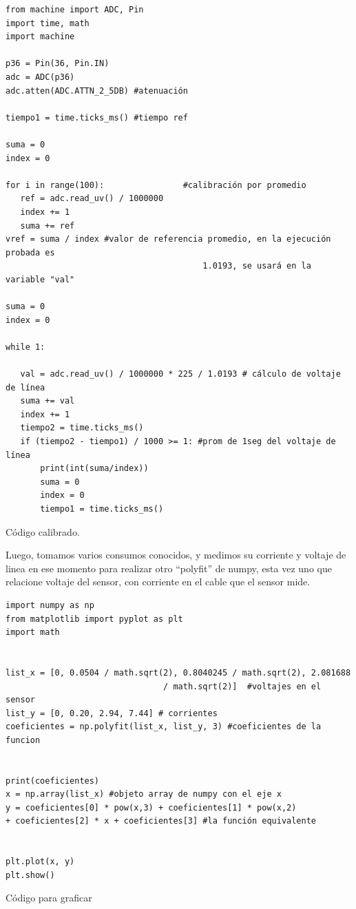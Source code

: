 \begin{listing}[H]
\begin{verbatim}
from machine import ADC, Pin
import time, math
import machine

p36 = Pin(36, Pin.IN)
adc = ADC(p36)
adc.atten(ADC.ATTN_2_5DB) #atenuación

tiempo1 = time.ticks_ms() #tiempo ref

suma = 0
index = 0

for i in range(100):                #calibración por promedio
   ref = adc.read_uv() / 1000000
   index += 1
   suma += ref
vref = suma / index #valor de referencia promedio, en la ejecución probada es 
                                        1.0193, se usará en la variable "val"

suma = 0
index = 0

while 1:

   val = adc.read_uv() / 1000000 * 225 / 1.0193 # cálculo de voltaje de línea
   suma += val
   index += 1
   tiempo2 = time.ticks_ms()
   if (tiempo2 - tiempo1) / 1000 >= 1: #prom de 1seg del voltaje de línea
       print(int(suma/index))
       suma = 0
       index = 0
       tiempo1 = time.ticks_ms()
\end{verbatim}
\caption{Código calibrado.}
\label{codigo calibrado}
\end{listing}

Luego, tomamos varios consumos conocidos, y medimos su corriente y voltaje de linea en ese momento para realizar otro “polyfit” de numpy, esta vez uno que relacione voltaje del sensor, con corriente en el cable que el sensor mide. \\

\begin{listing}[H]
\begin{verbatim}
import numpy as np
from matplotlib import pyplot as plt
import math


list_x = [0, 0.0504 / math.sqrt(2), 0.8040245 / math.sqrt(2), 2.081688 
                                / math.sqrt(2)]  #voltajes en el sensor
list_y = [0, 0.20, 2.94, 7.44] # corrientes
coeficientes = np.polyfit(list_x, list_y, 3) #coeficientes de la funcion


print(coeficientes)
x = np.array(list_x) #objeto array de numpy con el eje x
y = coeficientes[0] * pow(x,3) + coeficientes[1] * pow(x,2) 
+ coeficientes[2] * x + coeficientes[3] #la función equivalente


plt.plot(x, y)
plt.show()
\end{verbatim}
\caption{Código para graficar}
\label{codigo grafico 4/12}
\end{listing}

